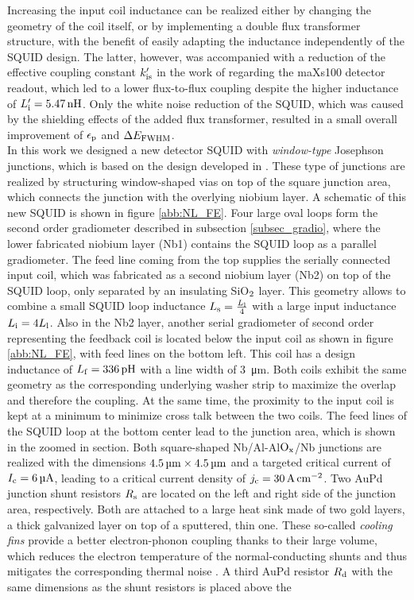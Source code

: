 Increasing the input coil inductance can be realized either by changing the geometry of the coil itself, or by implementing a double flux transformer structure, with the benefit of easily adapting the inductance independently of the SQUID design. The latter, however, was accompanied with a reduction of the effective coupling constant $k_{\rm is}'$ in the work of \cite{Bauer2022} regarding the maXs100 detector readout, which led to a lower flux-to-flux coupling despite the higher inductance of $L_{\rm i}'=\qty{5.47}{\nano\henry}$. Only the white noise reduction of the SQUID, which was caused by the shielding effects of the added flux transformer, resulted in a small overall improvement of $\epsilon_{\rm p}$ and $\Delta E_{\rm FWHM}$. \\
In this work we designed a new detector SQUID with \textit{window-type} Josephson junctions, which is based on the design developed in \cite{Bauer2022}. These type of junctions are realized by structuring window-shaped vias on top of the square junction area, which connects the junction with the overlying niobium layer. A schematic of this new SQUID is shown in figure \ref{abb:NL_FE}. Four large oval loops form the second order gradiometer described in subsection \ref{subsec_gradio}, where the lower fabricated niobium layer (Nb1) contains the SQUID loop as a parallel gradiometer. The feed line coming from the top supplies the serially connected input coil, which was fabricated as a second niobium layer (Nb2) on top of the SQUID loop, only separated by an insulating SiO$_{\rm 2}$ layer. This geometry allows to combine a small SQUID loop inductance $L_{\rm s}=\frac{L_{\rm l}}{4}$ with a large input inductance $L_{\rm i}=4L_{\rm l}$. Also in the Nb2 layer, another serial gradiometer of second order representing the feedback coil is located below the input coil as shown in figure \ref{abb:NL_FE}, with feed lines on the bottom left. This coil has a design inductance of $L_{\rm f}=\qty{336}{\pico\henry}$ with a line width of \qty{3}{\micro\meter}. Both coils exhibit the same geometry as the corresponding underlying washer strip to maximize the overlap and therefore the coupling. At the same time, the proximity to the input coil is kept at a minimum to minimize cross talk between the two coils. The feed lines of the SQUID loop at the bottom center lead to the junction area, which is shown in the zoomed in section. Both square-shaped Nb/Al-Al$\rm O_x$/Nb junctions are realized with the dimensions $\qtyproduct{4.5 x 4.5}{\micro\meter}$ and a targeted critical current of $I_{\rm c}=\qty{6}{\micro\ampere}$, leading to a critical current density of $j_{\rm c}=\qty{30}{\ampere\per\centi\meter\squared}$. Two AuPd junction shunt resistors $R_{\rm s}$ are located on the left and right side of the junction area, respectively. Both are attached to a large heat sink made of two gold layers, a thick galvanized layer on top of a sputtered, thin one. These so-called \textit{cooling fins} provide a better electron-phonon coupling thanks to their large volume, which reduces the electron temperature of the normal-conducting shunts and thus mitigates the corresponding thermal noise \cite{Mazibrada2024}. A third AuPd resistor $R_{\rm d}$ with the same dimensions as the shunt resistors is placed above the 